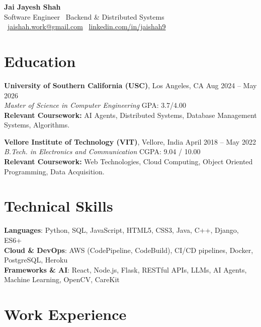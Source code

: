 \documentclass[letterpaper,11pt]{article}
\begin{document}
\begin{center}
    {\LARGE \textbf{Jai Jayesh Shah}}\\
    {\normalsize Software Engineer \textbar\ Backend \& Distributed Systems}\\
    \small
    \faEnvelope\ \href{mailto:jaishah.work@gmail.com}{jaishah.work@gmail.com}
    \quad
    \faLinkedin\ \href{https://www.linkedin.com/in/jaishah9}{linkedin.com/in/jaishah9}
\end{center}
\vspace{-13pt}


\section*{Education}
\textbf{University of Southern California (USC)}, Los Angeles, CA \hfill Aug 2024 -- May 2026 \\
\textit{Master of Science in Computer Engineering} \hfill GPA: 3.7/4.00 \\
\textbf{Relevant Coursework:} AI Agents, Distributed Systems, Database Management Systems, Algorithms.

\vspace{3pt}
\textbf{Vellore Institute of Technology (VIT)}, Vellore, India \hfill April 2018 -- May 2022 \\
\textit{B.Tech. in Electronics and Communication} \hfill CGPA: 9.04 / 10.00 \\
\textbf{Relevant Coursework:} Web Technologies, Cloud Computing, Object Oriented Programming, Data Acquisition.

\section*{Technical Skills}
\begin{itemize}[leftmargin=0.15in, label={}]
    {\item{
     \textbf{Languages}{: Python, SQL, JavaScript, HTML5, CSS3, Java, C++, Django, ES6+} \\
     \textbf{Cloud \& DevOps}{: AWS (CodePipeline, CodeBuild), CI/CD pipelines, Docker, PostgreSQL, Heroku} \\
     \textbf{Frameworks \& AI}{: React, Node.js, Flask, RESTful APIs, LLMs, AI Agents, Machine Learning, OpenCV, CareKit}
    }}
\end{itemize}

\section*{Work Experience}
\end{document}
